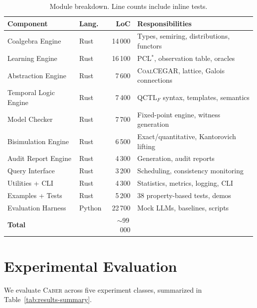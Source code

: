 \documentclass[11pt]{article}
\newcommand{\tool}{\textsc{Caber}}
\newcommand{\pclstar}{PCL$^*$}
\newcommand{\coalcegar}{\textsc{CoalCEGAR}}
\newcommand{\qctlf}{QCTL$_F$}
\begin{document}
\begin{table}[t]
\centering
\caption{Module breakdown.  Line counts include inline tests.}
\label{tab:modules}
\small
\begin{tabular}{@{}llrl@{}}
\toprule
\textbf{Component} & \textbf{Lang.} & \textbf{LoC} & \textbf{Responsibilities} \\
\midrule
Coalgebra Engine      & Rust  & 14\,000 & Types, semiring, distributions, functors \\
Learning Engine       & Rust  & 16\,100 & \pclstar{}, observation table, oracles \\
Abstraction Engine    & Rust  &  7\,600 & \coalcegar{}, lattice, Galois connections \\
Temporal Logic Engine & Rust  &  7\,400 & \qctlf{} syntax, templates, semantics \\
Model Checker         & Rust  &  7\,700 & Fixed-point engine, witness generation \\
Bisimulation Engine   & Rust  &  6\,500 & Exact/quantitative, Kantorovich lifting \\
Audit Report Engine   & Rust  &  4\,300 & Generation, audit reports \\
Query Interface       & Rust  &  3\,200 & Scheduling, consistency monitoring \\
Utilities + CLI       & Rust  &  4\,300 & Statistics, metrics, logging, CLI \\
Examples + Tests      & Rust  &  5\,200 & 38 property-based tests, demos \\
Evaluation Harness    & Python & 22\,700 & Mock LLMs, baselines, scripts \\
\midrule
\textbf{Total}        &       & $\sim$99\,000 & \\
\bottomrule
\end{tabular}
\end{table}

\section{Experimental Evaluation}\label{sec:eval}

We evaluate \tool{} across five experiment classes, summarized in
Table~\ref{tab:results-summary}.
\end{document}
